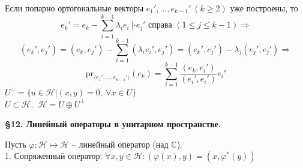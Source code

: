 \documentclass[a4paper, 12pt]{article}
\theoremstyle{definition}
\begin{document}
    Если попарно ортогональные векторы $e_1',...,e_{k-1}'\ 
    (k \geq 2)$ уже построены, то
    $$e_k' = e_k - \sum\limits_{i=1}^{k-1} \lambda_ie_i\ |
    \cdot e_j' \text{ справа } (1 \leq j \leq k - 1) 
    \Longrightarrow $$ 
    $$(e_k',e_j') = (e_k,e_j') - \sum\limits_{i=1}^{k-1} 
    (\lambda_ie_i',e_j') = (e_k', e_j') - \lambda_j(e_j',e_j')
    \Longrightarrow $$
    $$\text{pr}_{\langle e_1',...,e_{k-1}'\rangle}(e_k) =
    \sum\limits_{i=1}^{k-1} \frac{(e_k,e_i')}{(e_i',e_i')}
    e_i' $$
    $U^\perp = \{u \in \mathcal{H}| (x,y) = 0,\ \forall
    x \in U\}$\\
    $U \subset \mathcal{H},\ \ \mathcal{H} = U \oplus U^\perp $ 
    \begin{center}
        \begin{Large}
            \textbf{\S12. Линейный операторы в унитарном пространстве.}
        \end{Large}
    \end{center}
    Пусть $\varphi:\mathcal{H} \longmapsto \mathcal{H}$ --
    линейный оператор (над $\mathbb{C}$).\\
    1. Сопряженный оператор: $\forall x,y \in \mathcal{H}:
    (\varphi(x), y) = (x, \varphi^*(y))$
    
\end{document}
